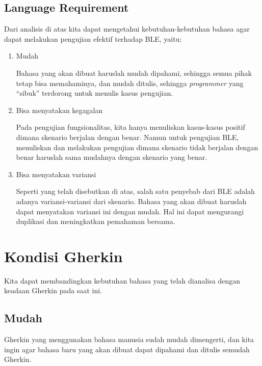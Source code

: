 \subsection{Language Requirement}

Dari analisis di atas kita dapat mengetahui kebutuhan-kebutuhan bahasa
agar dapat melakukan pengujian efektif terhadap BLE, yaitu:

\begin{enumerate}
  \item Mudah

        Bahasa yang akan dibuat haruslah mudah dipahami, sehingga semua pihak tetap
        bisa memahaminya, dan mudah ditulis, sehingga \emph{programmer} yang ``sibuk''
        terdorong untuk menulis kasus pengujian.

  \item Bisa menyatakan kegagalan

        Pada pengujian fungsionalitas, kita hanya menuliskan kasus-kasus positif
        dimana skenario berjalan dengan benar. Namun untuk pengujian BLE,
        menuliskan dan melakukan pengujian dimana skenario tidak berjalan dengan benar
        haruslah sama mudahnya dengan skenario yang benar.

  \item Bisa menyatakan variansi

        Seperti yang telah disebutkan di atas, salah satu penyebab dari BLE adalah
        adanya variansi-variansi dari skenario.
        Bahasa yang akan dibuat haruslah dapat menyatakan variansi ini dengan mudah.
        Hal ini dapat mengurangi duplikasi dan meningkatkan pemahaman bersama.
\end{enumerate}



\section{Kondisi Gherkin}

Kita dapat membandingkan kebutuhan bahasa yang telah dianalisa dengan keadaan Gherkin pada saat ini.

\subsection*{Mudah}

Gherkin yang menggunakan bahasa manusia sudah mudah dimengerti, dan kita ingin agar bahasa
baru yang akan dibuat dapat dipahami dan ditulis semudah Gherkin.

